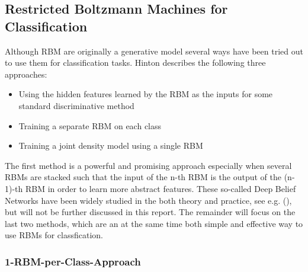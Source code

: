 \documentclass[a4paper]{scrartcl}
\begin{document}
\subsection{Restricted Boltzmann Machines for Classification}
Although RBM are originally a generative model several ways have been tried out to use them for classification tasks. Hinton \cite{Hinton} describes the following three approaches:
\begin{itemize}
    \item Using the hidden features learned by the RBM as the inputs for some standard discriminative method
    \item Training a separate RBM on each class
	\item Training a joint density model using a single RBM
\end{itemize}
The first method is a powerful and promising approach especially when several RBMs are stacked such that the input of the n-th RBM is the output of the (n-1)-th RBM in order to learn more abstract features. These so-called Deep Belief Networks have been widely studied in the both theory and practice, see e.g. (\cite{DeepBelief}), but will not be further discussed in this report. The remainder will focus on the last two methods, which are an at the same time both simple and effective way to use RBMs for classfication. 

\subsubsection{1-RBM-per-Class-Approach}
\end{document}

